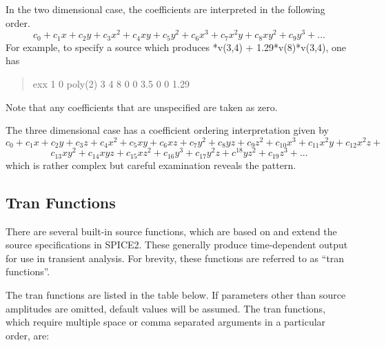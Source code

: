 In the two dimensional case, the coefficients are interpreted in the
following order.
\begin{displaymath}
c_0 + c_1x + c_2y + c_3x^2 + c_4xy + c_5y^2 + c_6x^3 + c_7x^2y +
c_8xy^2 + c_9y^3 + ...
\end{displaymath}
For example, to specify a source which produces
{*v(3,4) + 1.29*v(8)*v(3,4)}, one has
\begin{quote}
exx 1 0 poly(2) 3 4 8 0 0 3.5 0 0 1.29
\end{quote}
Note that any coefficients that are unspecified are taken as zero.

The three dimensional case has a coefficient ordering interpretation
given by
\begin{displaymath}
c_0 + c_1x + c_2y + c_3z + c_4x^2 + c_5xy + c_6xz + c_7y^2 + c_8yz +
c_9z^2 + c_{10}x^3 + c_{11}x^2y + c_{12}x^2z +
\end{displaymath}
\begin{displaymath}
c_{13}xy^2 + c_{14}xyz + c_{15}xz^2 + c_{16}y^3 + c_{17}y^2z + c^{18}yz^2 +
c_{19}z^3 + ...
\end{displaymath}
which is rather complex but careful examination reveals the pattern.

\subsection{Tran Functions}
\label{tranfuncs}


There are several built-in source functions, which are based on and
extend the source specifications in SPICE2.  These generally produce
time-dependent output for use in transient analysis.  For brevity,
these functions are referred to as ``tran functions''.

The tran functions are listed in the table below.  If parameters other
than source amplitudes are omitted, default values will be assumed. 
The tran functions, which require multiple space or comma separated
arguments in a particular order, are:

